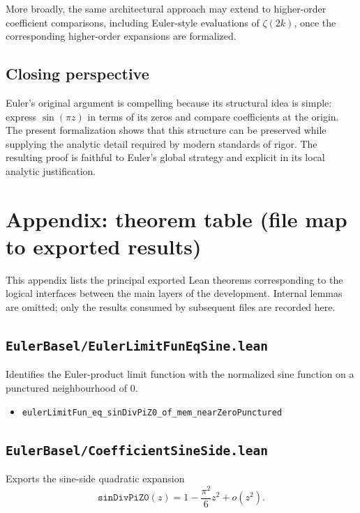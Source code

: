 \documentclass[11pt,a4paper]{article}
\theoremstyle{plain}
\theoremstyle{definition}
\DeclareRobustCommand{\codepath}[1]{\nolinkurl{#1}}
\DeclareRobustCommand{\leanid}[1]{\texttt{#1}}
\DeclareRobustCommand{\codepath}[1]{\nolinkurl{#1}}
\newcommand{\sinDivPiZZero}{\leanid{sinDivPiZ0}}
\begin{document}
More broadly, the same architectural approach may extend to higher-order coefficient comparisons, including Euler-style evaluations of \(\zeta(2k)\), once the corresponding higher-order expansions are formalized.

\subsection{Closing perspective}

Euler’s original argument is compelling because its structural idea is simple: express \(\sin(\pi z)\) in terms of its zeros and compare coefficients at the origin. The present formalization shows that this structure can be preserved while supplying the analytic detail required by modern standards of rigor. The resulting proof is faithful to Euler’s global strategy and explicit in its local analytic justification.

\clearpage
\section{Appendix: theorem table (file map to exported results)}
\label{sec:theorem-table}

This appendix lists the principal exported Lean theorems corresponding to the
logical interfaces between the main layers of the development.
Internal lemmas are omitted; only the results consumed by subsequent files
are recorded here.

\subsection*{\codepath{EulerBasel/EulerLimitFunEqSine.lean}}

Identifies the Euler-product limit function with the normalized sine function
on a punctured neighbourhood of \(0\).

\begin{itemize}[leftmargin=2em]
  \item \texttt{eulerLimitFun\_eq\_sinDivPiZ0\_of\_mem\_nearZeroPunctured}
\end{itemize}


\subsection*{\codepath{EulerBasel/CoefficientSineSide.lean}}

Exports the sine-side quadratic expansion
\[
\sinDivPiZZero(z)
=
1 - \frac{\pi^{2}}{6} z^{2}
+ o(z^{2}).
\]
\end{document}
